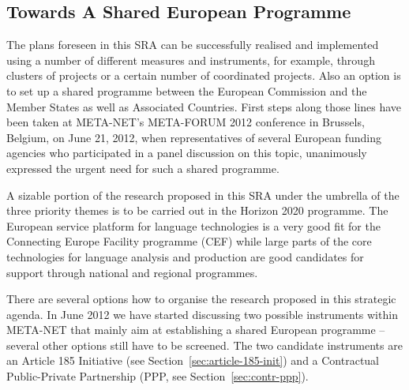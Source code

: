 \documentclass[10pt, plain]{../../metanetpaper}
\begin{document}
\begin{multicols}{2}
\subsection{Towards A Shared European Programme}
\label{sec:towards-shar-europ}

The plans foreseen in this SRA can be successfully realised and implemented using a number of different measures and instruments, for example, through clusters of projects or a certain number of coordinated projects. Also an option is to set up a shared programme between the European Commission and the Member States as well as Associated Countries. First steps along those lines have been taken at META-NET's META-FORUM 2012 conference in Brussels, Belgium, on June 21, 2012, when representatives of several European funding agencies who participated in a panel discussion on this topic, unanimously expressed the urgent need for such a shared programme.

A sizable portion of the research proposed in this SRA under the umbrella of the three priority themes is to be carried out in the Horizon 2020 programme. The European service platform for language technologies is a very good fit for the Connecting Europe Facility programme (CEF) while large parts of the core technologies for language analysis and production are good candidates for support through national and regional programmes.

There are several options how to organise the research proposed in this strategic agenda. In June 2012 we have started discussing two possible instruments within META-NET that mainly aim at establishing a shared European programme -- several other options still have to be screened. The two candidate instruments are an Article 185 Initiative (see Section~\ref{sec:article-185-init}) and a Contractual Public-Private Partnership (PPP, see Section~\ref{sec:contr-ppp}).

%


\end{multicols}
\end{document}
